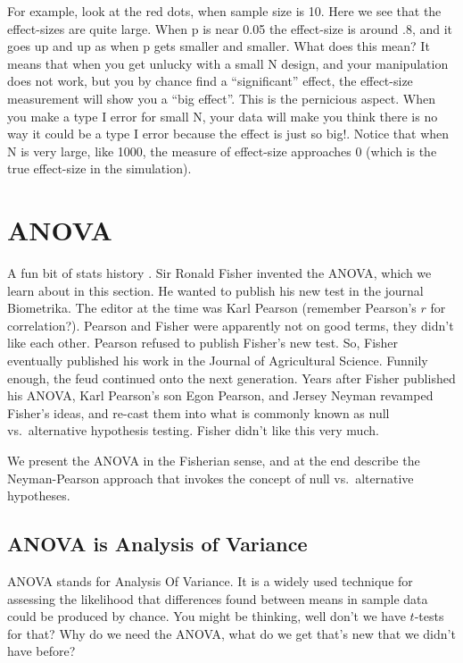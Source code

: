 \documentclass[
]{book}
\begin{document}
For example, look at the red dots, when sample size is 10. Here we see that the effect-sizes are quite large. When p is near 0.05 the effect-size is around .8, and it goes up and up as when p gets smaller and smaller. What does this mean? It means that when you get unlucky with a small N design, and your manipulation does not work, but you by chance find a ``significant'' effect, the effect-size measurement will show you a ``big effect''. This is the pernicious aspect. When you make a type I error for small N, your data will make you think there is no way it could be a type I error because the effect is just so big!. Notice that when N is very large, like 1000, the measure of effect-size approaches 0 (which is the true effect-size in the simulation).

\chapter{ANOVA}\label{anova}

A fun bit of stats history \citep{salsburg2001lady}. Sir Ronald Fisher invented the ANOVA, which we learn about in this section. He wanted to publish his new test in the journal Biometrika. The editor at the time was Karl Pearson (remember Pearson's \(r\) for correlation?). Pearson and Fisher were apparently not on good terms, they didn't like each other. Pearson refused to publish Fisher's new test. So, Fisher eventually published his work in the Journal of Agricultural Science. Funnily enough, the feud continued onto the next generation. Years after Fisher published his ANOVA, Karl Pearson's son Egon Pearson, and Jersey Neyman revamped Fisher's ideas, and re-cast them into what is commonly known as null vs.~alternative hypothesis testing. Fisher didn't like this very much.

We present the ANOVA in the Fisherian sense, and at the end describe the Neyman-Pearson approach that invokes the concept of null vs.~alternative hypotheses.

\section{ANOVA is Analysis of Variance}\label{anova-is-analysis-of-variance}

ANOVA stands for Analysis Of Variance. It is a widely used technique for assessing the likelihood that differences found between means in sample data could be produced by chance. You might be thinking, well don't we have \(t\)-tests for that? Why do we need the ANOVA, what do we get that's new that we didn't have before?
\end{document}
